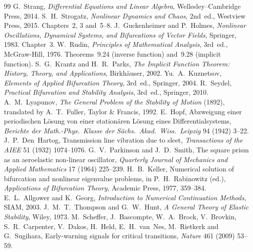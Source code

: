 \begin{chapterbib}{99}
 G.~Strang, \emph{Differential Equations and Linear
  Algebra}, Wellesley--Cambridge Press, 2014.
 S.~H.~Strogatz, \emph{Nonlinear Dynamics and Chaos},
  2nd~ed., Westview Press, 2015. Chapters~2, 3 and~5--8.
 J.~Guckenheimer and P.~Holmes, \emph{Nonlinear
  Oscillations, Dynamical Systems, and Bifurcations of Vector Fields}, Springer,
  1983. Chapter~3.
 W.~Rudin, \emph{Principles of Mathematical Analysis}, 3rd~ed.,
  McGraw-Hill, 1976. Theorems~9.24 (inverse function) and~9.28 (implicit function).
 S.~G.~Krantz and H.~R.~Parks, \emph{The Implicit Function
  Theorem: History, Theory, and Applications}, Birkh\"auser, 2002.
 Yu.~A.~Kuznetsov, \emph{Elements of Applied Bifurcation
  Theory}, 3rd~ed., Springer, 2004.
 R.~Seydel, \emph{Practical Bifurcation and Stability
  Analysis}, 3rd~ed., Springer, 2010.
 A.~M.~Lyapunov, \emph{The General Problem of the Stability
  of Motion} (1892), translated by A.~T.~Fuller, Taylor \& Francis, 1992.
 E.~Hopf, Abzweigung einer periodischen L\"osung von einer
  station\"aren L\"osung eines Differentialsystems, \emph{Berichte der
  Math.-Phys.\ Klasse der S\"achs.\ Akad.\ Wiss.\ Leipzig} 94 (1942) 3--22.
 J.~P.~Den~Hartog, Transmission line vibration due to
  sleet, \emph{Transactions of the AIEE} 51 (1932) 1074--1076.
 G.~V.~Parkinson and J.~D.~Smith, The square prism as an
  aeroelastic non-linear oscillator, \emph{Quarterly Journal of Mechanics and Applied
  Mathematics} 17 (1964) 225--239.
 H.~B.~Keller, Numerical solution of bifurcation and
  nonlinear eigenvalue problems, in P.~H.~Rabinowitz (ed.), \emph{Applications of
  Bifurcation Theory}, Academic Press, 1977, 359--384.
 E.~L.~Allgower and K.~Georg, \emph{Introduction to
  Numerical Continuation Methods}, SIAM, 2003.
 J.~M.~T.~Thompson and G.~W.~Hunt, \emph{A General
  Theory of Elastic Stability}, Wiley, 1973.
 M.~Scheffer, J.~Bascompte, W.~A.~Brock, V.~Brovkin,
  S.~R.~Carpenter, V.~Dakos, H.~Held, E.~H.~van~Nes, M.~Rietkerk and G.~Sugihara,
  Early-warning signals for critical transitions, \emph{Nature} 461 (2009) 53--59.
\end{chapterbib}
